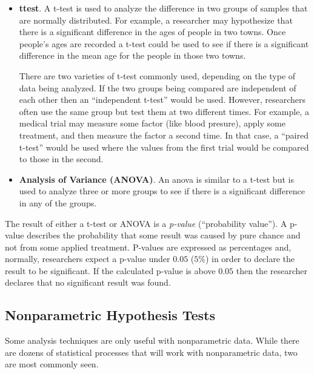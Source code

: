 \begin{itemize}
	\item \textbf{\Gls{ttest}}. A t-test is used to analyze the difference in two groups of samples that are normally distributed. For example, a researcher may hypothesize that there is a significant difference in the ages of people in two towns. Once people's ages are recorded a t-test could be used to see if there is a significant difference in the mean age for the people in those two towns.
	
	There are two varieties of t-test commonly used, depending on the type of data being analyzed. If the two groups being compared are independent of each other then an ``independent t-test'' would be used. However, researchers often use the same group but test them at two different times. For example, a medical trial may measure some factor (like blood presure), apply some treatment, and then measure the factor a second time. In that case, a ``paired t-test'' would be used where the values from the first trial would be compared to those in the second.
	
	\item \textbf{Analysis of Variance (ANOVA)}. An \Gls{anova} is similar to a t-test but is used to analyze three or more groups to see if there is a significant difference in any of the groups.
\end{itemize}

The result of either a t-test or ANOVA is a \textit{p-value} (``probability value''). A p-value describes the probability that some result was caused by pure chance and not from some applied treatment. P-values are expressed as percentages and, normally, researchers expect a p-value under $ 0.05 $ ($ 5\% $) in order to declare the result to be significant. If the calculated p-value is above $ 0.05 $ then the researcher declares that no significant result was found.

\subsection{Nonparametric Hypothesis Tests}

Some analysis techniques are only useful with \gls{nonparametric} data. While there are dozens of statistical processes that will work with nonparametric data, two are most commonly seen.

